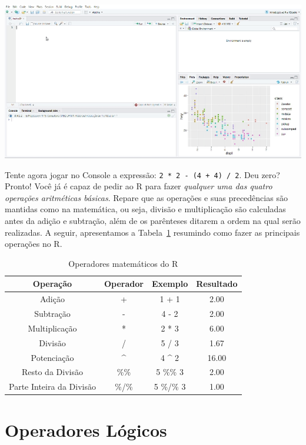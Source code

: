 \documentclass[
  letterpaper,
  DIV=11,
  numbers=noendperiod]{scrreprt}
\begin{document}
\begin{center}
\includegraphics{images/1mais1.gif}
\end{center}

Tente agora jogar no Console a expressão:
\texttt{2\ *\ 2\ -\ (4\ +\ 4)\ /\ 2}. Deu zero? Pronto! Você já é capaz
de pedir ao R para fazer \emph{qualquer uma das quatro operações
aritméticas básicas}. Repare que as operações e suas precedências são
mantidas como na matemática, ou seja, divisão e multiplicação são
calculadas antes da adição e subtração, além de os parênteses ditarem a
ordem na qual serão realizadas. A seguir, apresentamos a
Tabela~\ref{tbl-ope-mat} resumindo como fazer as principais operações no
R.

\begin{longtable}[]{@{}cccc@{}}

\caption{\label{tbl-ope-mat}Operadores matemáticos do R}

\tabularnewline

\toprule\noalign{}
Operação & Operador & Exemplo & Resultado \\
\midrule\noalign{}
\endhead
\bottomrule\noalign{}
\endlastfoot
Adição & + & 1 + 1 & 2.00 \\
Subtração & - & 4 - 2 & 2.00 \\
Multiplicação & * & 2 * 3 & 6.00 \\
Divisão & / & 5 / 3 & 1.67 \\
Potenciação & \^{} & 4 \^{} 2 & 16.00 \\
Resto da Divisão & \%\% & 5 \%\% 3 & 2.00 \\
Parte Inteira da Divisão & \%/\% & 5 \%/\% 3 & 1.00 \\

\end{longtable}

\section{Operadores Lógicos}\label{operadores-luxf3gicos}
\end{document}
